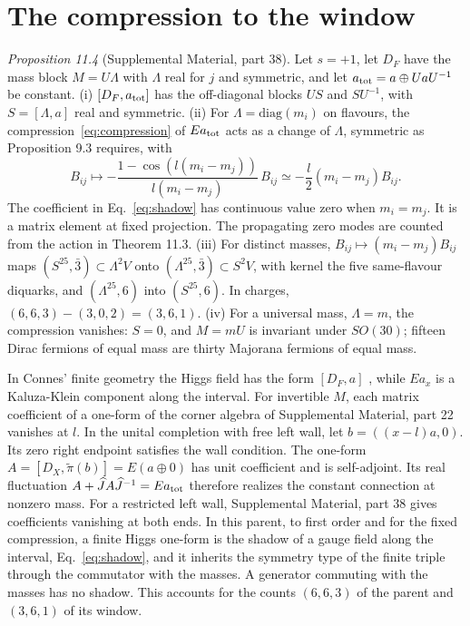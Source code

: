 \documentclass[aps,prd,reprint,onecolumn,nofootinbib,amsmath,amssymb,floatfix]{revtex4-2}
\theoremstyle{plain}
\newcommand{\supp}[1]{Supplemental Material, part #1}
\begin{document}
\section{The compression to the window}\label{sec:window}

\smallskip\noindent\textit{Proposition 11.4} (\supp{38}). Let $s=+1$, let $D_F$ have the mass block $M=U\Lambda$ with $\Lambda$ real for $j$ and symmetric, and let $a_{\rm tot}=a\oplus UaU^{-1}$ be constant.
(i) $[D_F,a_{\rm tot}]$ has the off-diagonal blocks $US$ and $SU^{-1}$, with $S=[\Lambda,a]$ real and symmetric.
(ii) For $\Lambda=\mathrm{diag}(m_i)$ on flavours, the compression~\eqref{eq:compression} of $Ea_{\rm tot}$ acts as a change of $\Lambda$, symmetric as Proposition 9.3 requires, with
\begin{equation}\label{eq:shadow}
B_{ij}\mapsto-\frac{1-\cos(l(m_i-m_j))}{l(m_i-m_j)}\,B_{ij}\simeq-\frac l2(m_i-m_j)B_{ij}.
\end{equation}
The coefficient in Eq.~\eqref{eq:shadow} has continuous value zero when $m_i=m_j$. It is a matrix element at fixed projection. The propagating zero modes are counted from the action in Theorem 11.3. (iii) For distinct masses, $B_{ij}\mapsto(m_i-m_j)B_{ij}$ maps $(S^25,\bar3)\subset\Lambda^2V$ onto $(\Lambda^25,\bar3)\subset S^2V$, with kernel the five same-flavour diquarks, and $(\Lambda^25,6)$ into $(S^25,6)$. In charges, $(6,6,3)-(3,0,2)=(3,6,1)$.
(iv) For a universal mass, $\Lambda=m$, the compression vanishes: $S=0$, and $M=mU$ is invariant under $SO(30)$; fifteen Dirac fermions of equal mass are thirty Majorana fermions of equal mass.
\smallskip

In Connes' finite geometry the Higgs field has the form $[D_F,a]$ \cite{ConnesLott1991}, while $Ea_x$ is a Kaluza-Klein component along the interval. For invertible $M$, each matrix coefficient of a one-form of the corner algebra of \supp{22} vanishes at $l$. In the unital completion with free left wall, let $b=((x-l)a,0)$. Its zero right endpoint satisfies the wall condition. The one-form $A=[D_X,\widetilde\pi(b)]=E(a\oplus0)$ has unit coefficient and is self-adjoint. Its real fluctuation $A+\widehat J A\widehat J^{-1}=Ea_{\rm tot}$ therefore realizes the constant connection at nonzero mass. For a restricted left wall, \supp{38} gives coefficients vanishing at both ends. In this parent, to first order and for the fixed compression, a finite Higgs one-form is the shadow of a gauge field along the interval, Eq.~\eqref{eq:shadow}, and it inherits the symmetry type of the finite triple through the commutator with the masses. A generator commuting with the masses has no shadow. This accounts for the counts $(6,6,3)$ of the parent and $(3,6,1)$ of its window.
\end{document}
